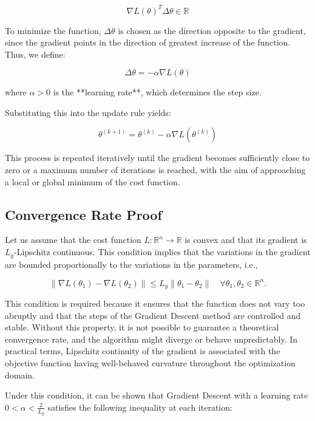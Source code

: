 \documentclass[12pt, letterpaper,conference]{IEEEtran}
\begin{document}
\[
\nabla L(\theta)^T \Delta \theta \in \mathbb{R}
\]

To minimize the function, \( \Delta \theta \) is chosen as the direction opposite to the gradient, since the gradient points in the direction of greatest increase of the function. Thus, we define:

\[
\Delta \theta = -\alpha \nabla L(\theta)
\]

where \( \alpha > 0 \) is the **learning rate**, which determines the step size.

Substituting this into the update rule yields:

\[
\theta^{(k+1)} = \theta^{(k)} - \alpha \nabla L(\theta^{(k)})
\]

This process is repeated iteratively until the gradient becomes sufficiently close to zero or a maximum number of iterations is reached, with the aim of approaching a local or global minimum of the cost function.



\vspace{0.25cm}

\subsection{Convergence Rate Proof}

Let us assume that the cost function \( L: \mathbb{R}^n \rightarrow \mathbb{R} \) is convex and that its gradient is \( L_g \)-Lipschitz continuous. This condition implies that the variations in the gradient are bounded proportionally to the variations in the parameters, i.e.,

\[
\| \nabla L(\theta_1) - \nabla L(\theta_2) \| \leq L_g \| \theta_1 - \theta_2 \| \quad \forall \theta_1, \theta_2 \in \mathbb{R}^n.
\]

This condition is required because it ensures that the function does not vary too abruptly and that the steps of the Gradient Descent method are controlled and stable. Without this property, it is not possible to guarantee a theoretical convergence rate, and the algorithm might diverge or behave unpredictably. In practical terms, Lipschitz continuity of the gradient is associated with the objective function having well-behaved curvature throughout the optimization domain.

Under this condition, it can be shown that Gradient Descent with a learning rate \( 0 < \alpha < \frac{2}{L_g} \) satisfies the following inequality at each iteration:
\end{document}

